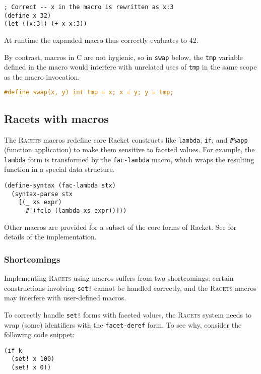 \documentclass{article}
\begin{document}
\begin{lstlisting}
; Correct -- x in the macro is rewritten as x:3
(define x 32)
(let ([x:3]) (+ x x:3))
\end{lstlisting}

At runtime the expanded macro thus correctly evaluates to 42.

By contrast, macros in C are not hygienic, so in \texttt{swap} below, the \texttt{tmp} variable defined in the macro would interfere with unrelated uses of \texttt{tmp} in the same scope as the macro invocation.

\begin{lstlisting}[language=C]
#define swap(x, y) int tmp = x; x = y; y = tmp;
\end{lstlisting}


\subsection{Racets with macros}
The \textsc{Racets} macros redefine core Racket constructs like \texttt{lambda}, \texttt{if}, and \texttt{\#\%app} (function application) to make them sensitive to faceted values. For example, the \texttt{lambda} form is transformed by the \texttt{fac-lambda} macro, which wraps the resulting function in a special data structure.

\begin{lstlisting}
(define-syntax (fac-lambda stx)
  (syntax-parse stx
    [(_ xs expr)
      #'(fclo (lambda xs expr))]))
\end{lstlisting}

Other macros are provided for a subset of the core forms of Racket. See \cite{racets} for details of the implementation.


\subsubsection{Shortcomings\label{sec:shortcomings}}
Implementing \textsc{Racets} using macros suffers from two shortcomings: certain constructions involving \texttt{set!} cannot be handled correctly, and the \textsc{Racets} macros may interfere with user-defined macros.

To correctly handle \texttt{set!} forms with faceted values, the \textsc{Racets} system needs to wrap (some) identifiers with the \texttt{facet-deref} form. To see why, consider the following code snippet:

\begin{lstlisting}
(if k
  (set! x 100)
  (set! x 0))
\end{lstlisting}
\end{document}
